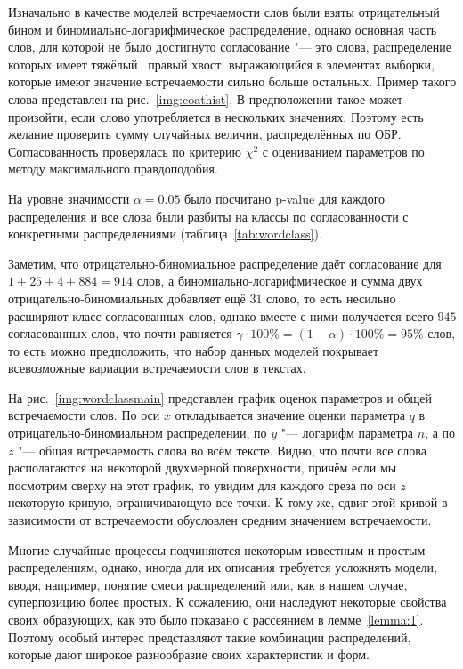 \documentclass[12pt, specialist, subf, substylefile = spbu_report.rtx]{disser}
\begin{document}
	Изначально в качестве моделей встречаемости слов были взяты отрицательный бином и биномиально-логарифмическое распределение, однако основная часть слов, для которой не было достигнуто согласование "--- это слова, распределение которых имеет \glqq тяжёлый\grqq~ правый хвост, выражающийся в элементах выборки, которые имеют значение встречаемости сильно больше остальных. Пример такого слова представлен на рис.~\ref{img:coathist}. В предположении такое может произойти, если слово употребляется в нескольких значениях. Поэтому есть желание проверить сумму случайных величин, распределённых по ОБР. Согласованность проверялась по критерию $ \chi ^2 $ с оцениванием параметров по методу максимального правдоподобия.
	
	На уровне значимости $ \alpha = 0.05 $ было посчитано p-value для каждого распределения и все слова были разбиты на классы по согласованности с конкретными распределениями (таблица~\ref{tab:wordclass}).
	
	Заметим, что отрицательно-биномиальное распределение даёт согласование для $1 + 25 + 4 + 884 = 914$ слов, а биномиально-логарифмическое и сумма двух отрицательно-биномиальных добавляет ещё $31$ слово, то есть несильно расширяют класс согласованных слов, однако вместе с ними получается всего $945$ согласованных слов, что почти равняется $\gamma \cdot 100 \% = (1 - \alpha) \cdot 100 \% = 95 \%$ слов, то есть можно предположить, что набор данных моделей покрывает всевозможные вариации встречаемости слов в текстах.
	
	На рис.~\ref{img:wordclassmain} представлен график оценок параметров и общей встречаемости слов. По оси $x$ откладывается значение оценки параметра $q$ в отрицательно-биномиальном распределении, по $y$ "--- логарифм параметра $n$, а по $z$ "--- общая встречаемость слова во всём тексте. Видно, что почти все слова располагаются на некоторой двухмерной поверхности, причём если мы посмотрим сверху на этот график, то увидим для каждого среза по оси $z$ некоторую кривую, ограничивающую все точки. К тому же, сдвиг этой кривой в зависимости от встречаемости обусловлен средним значением встречаемости.
		
	\conclusion
	
	Многие случайные процессы подчиняются некоторым известным и простым распределениям, однако, иногда для их описания требуется усложнять модели, вводя, например, понятие смеси распределений или, как в нашем случае, суперпозицию более простых. К сожалению, они наследуют некоторые свойства своих образующих, как это было показано с рассеянием в лемме~\ref{lemma:1}. Поэтому особый интерес представляют такие комбинации распределений, которые дают широкое разнообразие своих характеристик и форм.
	
\end{document}
